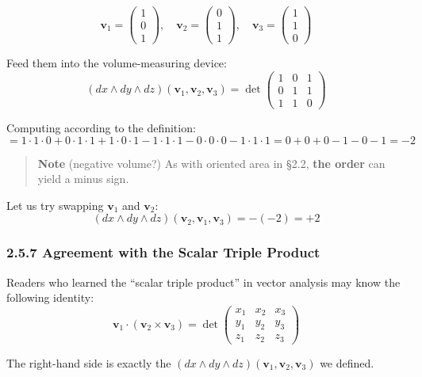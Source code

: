 \documentclass[a4paper,12pt,openany]{book}
\begin{document}
\[\mathbf{v}_1 = \begin{pmatrix}1\\0\\1\end{pmatrix}, \quad \mathbf{v}_2 = \begin{pmatrix}0\\1\\1\end{pmatrix}, \quad \mathbf{v}_3 = \begin{pmatrix}1\\1\\0\end{pmatrix}\]

Feed them into the volume-measuring device:
\[(dx \wedge dy \wedge dz)(\mathbf{v}_1, \mathbf{v}_2, \mathbf{v}_3) = \det\begin{pmatrix}1 & 0 & 1 \\ 0 & 1 & 1 \\ 1 & 1 & 0\end{pmatrix}\]

Computing according to the definition:
\[= 1\cdot1\cdot0 + 0\cdot1\cdot1 + 1\cdot0\cdot1 - 1\cdot1\cdot1 - 0\cdot0\cdot0 - 1\cdot1\cdot1 = 0 + 0 + 0 - 1 - 0 - 1 = -2\]

\begin{quote}
\textbf{Note} (negative volume?) As with oriented area in §2.2,
\textbf{the order} can yield a minus sign.
\end{quote}

Let us try swapping \(\mathbf{v}_1\) and \(\mathbf{v}_2\):
\[(dx \wedge dy \wedge dz)(\mathbf{v}_2, \mathbf{v}_1, \mathbf{v}_3) = -(-2) = +2\]

\hypertarget{agreement-with-the-scalar-triple-product}{%
\subsubsection{2.5.7 Agreement with the Scalar Triple
Product}\label{agreement-with-the-scalar-triple-product}}

Readers who learned the ``scalar triple product'' in vector analysis may
know the following identity:
\[\mathbf{v}_1 \cdot (\mathbf{v}_2 \times \mathbf{v}_3) = \det\begin{pmatrix}x_1 & x_2 & x_3 \\ y_1 & y_2 & y_3 \\ z_1 & z_2 & z_3\end{pmatrix}\]

The right-hand side is exactly the
\((dx \wedge dy \wedge dz)(\mathbf{v}_1, \mathbf{v}_2, \mathbf{v}_3)\)
we defined.
\end{document}
